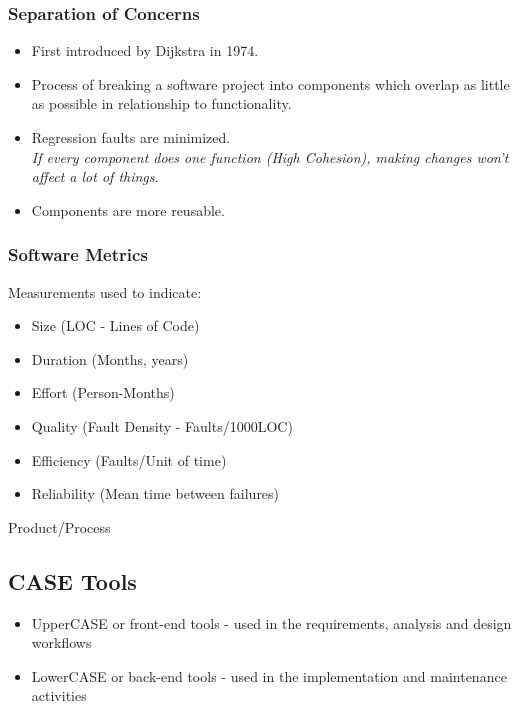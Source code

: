 \documentclass{report}
\begin{document}
				\subsubsection{Separation of Concerns}
					\begin{itemize}
						\item First introduced by Dijkstra in 1974.
						\item Process of breaking a software project into components which overlap as little as possible in relationship to functionality.
						\item Regression faults are minimized.\\
							\textit{If every component does one function (High Cohesion), making changes won't affect a lot of things.}
						\item Components are more reusable.
					\end{itemize}
				\subsubsection{Software Metrics}
					Measurements used to indicate:
					\begin{itemize}
						\item Size (LOC - Lines of Code)
						\item Duration (Months, years)
						\item Effort (Person-Months)
						\item Quality (Fault Density - Faults/1000LOC)
						\item Efficiency (Faults/Unit of time)
						\item Reliability (Mean time between failures)
					\end{itemize}
					Product/Process
			\subsection{CASE Tools}
				\begin{itemize}
					\item UpperCASE or front-end tools - used in the requirements, analysis and design workflows
					\item LowerCASE or back-end tools - used in the implementation and maintenance activities
				\end{itemize}
\end{document}
